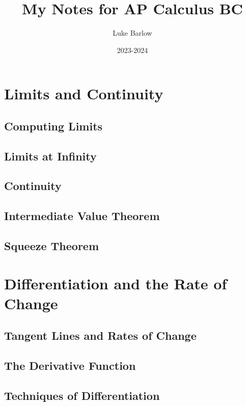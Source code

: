 \documentclass[letterpaper]{report}
\title{My Notes for AP Calculus BC}
\author{Luke Barlow}
\date{2023-2024}
\theoremstyle{definition}
\begin{document}
\maketitle
\tableofcontents

\chapter{Limits and Continuity}

\section{Computing Limits}

\section{Limits at Infinity}

\section{Continuity}

\section{Intermediate Value Theorem}

\section{Squeeze Theorem}


\chapter{Differentiation and the Rate of Change}

\section{Tangent Lines and Rates of Change}

\section{The Derivative Function}

\section{Techniques of Differentiation}
\end{document}

